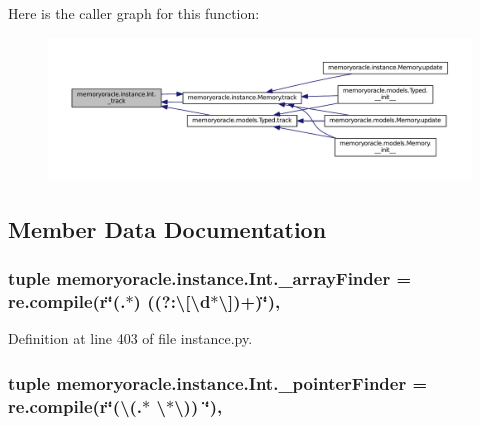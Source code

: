 Here is the caller graph for this function\+:
\nopagebreak
\begin{figure}[H]
\begin{center}
\leavevmode
\includegraphics[width=350pt]{classmemoryoracle_1_1instance_1_1Int_a38c9424341353f006771163d360594da_icgraph}
\end{center}
\end{figure}




\subsection{Member Data Documentation}
\hypertarget{classmemoryoracle_1_1instance_1_1Int_a43fc91196a9f69183688d7f5a0bd6a17}{}
\subsubsection[{\+\_\+array\+Finder}]{\setlength{\rightskip}{0pt plus 5cm}tuple memoryoracle.\+instance.\+Int.\+\_\+array\+Finder = re.\+compile(r\char`\"{}(.$\ast$) ((?\+:\textbackslash{}\mbox{[}\textbackslash{}d$\ast$\textbackslash{}\mbox{]})+)\char`\"{})\hspace{0.3cm}{\ttfamily [static]}, {\ttfamily [private]}}\label{classmemoryoracle_1_1instance_1_1Int_a43fc91196a9f69183688d7f5a0bd6a17}


Definition at line 403 of file instance.\+py.

\hypertarget{classmemoryoracle_1_1instance_1_1Int_a74d2d1d291b5d9f06c7230b60ebf1aab}{}
\subsubsection[{\+\_\+pointer\+Finder}]{\setlength{\rightskip}{0pt plus 5cm}tuple memoryoracle.\+instance.\+Int.\+\_\+pointer\+Finder = re.\+compile(r\char`\"{}(\textbackslash{}(.$\ast$ \textbackslash{}$\ast$\textbackslash{})) \char`\"{})\hspace{0.3cm}{\ttfamily [static]}, {\ttfamily [private]}}\label{classmemoryoracle_1_1instance_1_1Int_a74d2d1d291b5d9f06c7230b60ebf1aab}


